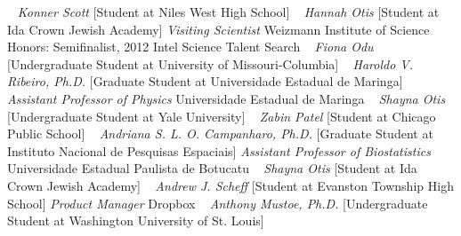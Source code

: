 ~
\Gap{}
\textit{Konner Scott}
    [Student at Niles West High School]
\newline
~
\Gap{}
\textit{Hannah Otis}
    [Student at Ida Crown Jewish Academy]
\newline
    \textit{Visiting Scientist}
    \newline
    Weizmann Institute of Science
    \newline
    {\footnotesize Honors: Semifinalist, 2012 Intel Science Talent Search}
    \newline
~
\Gap{}
\textit{Fiona Odu}
    [Undergraduate Student at University of Missouri-Columbia]
\newline
~
\Gap{}
\textit{Haroldo V. Ribeiro, Ph.D.}
    [Graduate Student at Universidade Estadual de Maringa]
\newline
    \textit{Assistant Professor of Physics}
    \newline
    Universidade Estadual de Maringa
    \newline
~
\Gap{}
\textit{Shayna Otis}
    [Undergraduate Student at Yale University]
\newline
~
\Gap{}
\textit{Zabin Patel}
    [Student at Chicago Public School]
\newline
~
\Gap{}
\textit{Andriana S. L. O. Campanharo, Ph.D.}
    [Graduate Student at Instituto Nacional de Pesquisas Espaciais]
\newline
    \textit{Assistant Professor of Biostatistics}
    \newline
    Universidade Estadual Paulista de Botucatu
    \newline
~
\Gap{}
\textit{Shayna Otis}
    [Student at Ida Crown Jewish Academy]
\newline
~
\Gap{}
\textit{Andrew J. Scheff}
    [Student at Evanston Township High School]
\newline
    \textit{Product Manager}
    \newline
    Dropbox
    \newline
~
\Gap{}
\textit{Anthony Mustoe, Ph.D.}
    [Undergraduate Student at Washington University of St. Louis]
\newline
